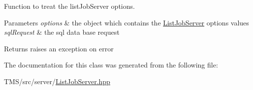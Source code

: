 Function to treat the listJobServer options. 


\begin{DoxyParams}{Parameters}
{\em options} & the object which contains the \hyperlink{classListJobServer}{ListJobServer} options values \\
\hline
{\em sqlRequest} & the sql data base request \\
\hline
\end{DoxyParams}
\begin{DoxyReturn}{Returns}
raises an exception on error 
\end{DoxyReturn}


The documentation for this class was generated from the following file:\begin{DoxyCompactItemize}
\item 
TMS/src/server/\hyperlink{ListJobServer_8hpp}{ListJobServer.hpp}\end{DoxyCompactItemize}

